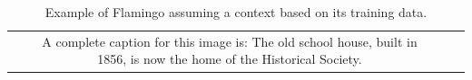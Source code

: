 \begin{table}[ht]
\begin{tabular}{c|c|c|c}
\begin{minipage}[c]{0.2\linewidth}
        \end{minipage} &
        \begin{minipage}[c]{0.3\linewidth}
            A complete caption for this image is: The old school house, built in 1856, is now the home of the Historical Society.
        \end{minipage} \\
    \end{tabular}
    \caption{Example of Flamingo assuming a context based on its training data.}
    \label{tab:out-of-context}
\end{table}









